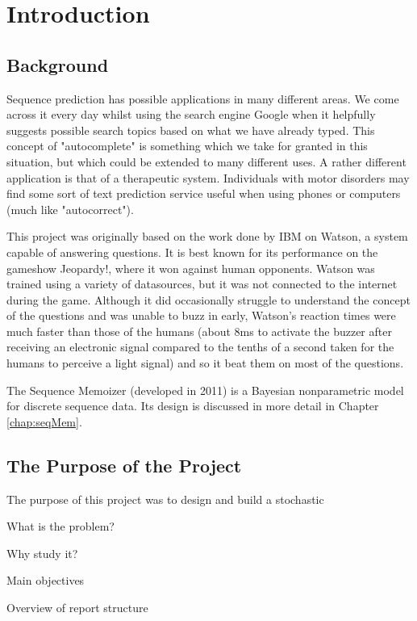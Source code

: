 \chapter{Introduction}

\section{Background}

Sequence prediction has possible applications in many different areas. We come across it every day whilst using the search engine Google when it helpfully suggests possible search topics based on what we have already typed. This concept of "autocomplete" is something which we take for granted in this situation, but which could be extended to many different uses. A rather different application is that of a therapeutic system. Individuals with motor disorders may find some sort of text prediction service useful when using phones or computers (much like "autocorrect"). 

This project was originally based on the work done by IBM on Watson, a system capable of answering questions. It is best known for its performance on the gameshow Jeopardy!, where it won against human opponents. Watson was trained using a variety of datasources, but it was not connected to the internet during the game. Although it did occasionally struggle to understand the concept of the questions and was unable to buzz in early, Watson's reaction times were much faster than those of the humans (about 8ms to activate the buzzer after receiving an electronic signal compared to the tenths of a second taken for the humans to perceive a light signal) and so it beat them on most of the questions.

The Sequence Memoizer (developed in 2011) is a Bayesian nonparametric model for discrete sequence data. Its design is discussed in more detail in Chapter \ref{chap:seqMem}. 



\section{The Purpose of the Project}


The purpose of this project was to design and build a stochastic 

What is the problem?

Why study it?

Main objectives

Overview of report structure